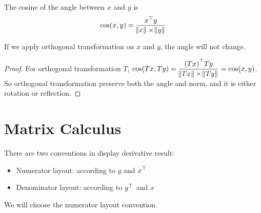 \begin{theorem}
    The cosine of the angle between $x$ and $y$ is
    \begin{equation}
        \cos(x,y) = \frac{{x}^\top y}{\norm{x} \times \norm{y}}
    \end{equation}
    
    If we apply orthogonal transformation on $x$ and $y$, the angle will not change.
\end{theorem}
\begin{proof}
    For orthogonal transformation $T$, $\displaystyle \cos(Tx, Ty) = \frac{{(Tx)}^\top Ty}{\norm{Tx} \times \norm{Ty}} = \cos(x,y)$. So orthogonal transformation preserve both the angle and norm, and it is either rotation or reflection.
\end{proof}


\section{Matrix Calculus}

There are two conventions in display derivative result:
\begin{itemize}
    \item Numerator layout: according to $y$ and ${x}^\top$
    \item Denominator layout: according to ${y}^\top$ and $x$
\end{itemize}

We will choose the numerator layout convention.

